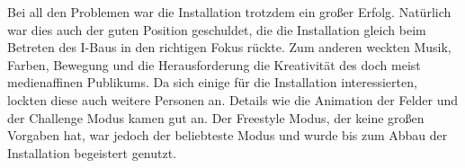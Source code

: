 Bei all den Problemen war die Installation trotzdem ein großer Erfolg. Natürlich war dies auch der guten Position geschuldet, die die Installation gleich beim Betreten des I-Baus in den richtigen Fokus rückte. Zum anderen weckten Musik, Farben, Bewegung und die Herausforderung die Kreativität des doch meist medienaffinen Publikums. Da sich einige für die Installation interessierten, lockten diese auch weitere Personen an. Details wie die Animation der Felder und der Challenge Modus kamen gut an. Der Freestyle Modus, der keine großen Vorgaben hat, war jedoch der beliebteste Modus und wurde bis zum Abbau der Installation begeistert genutzt.